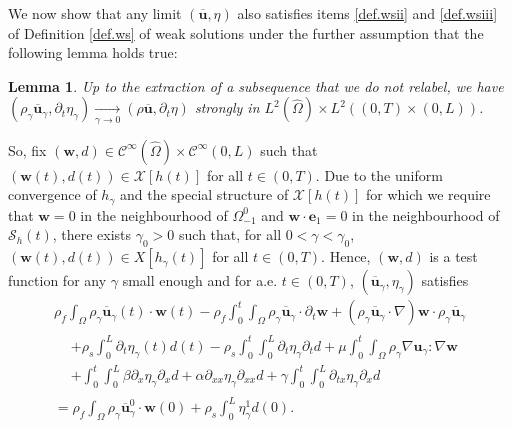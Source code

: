 \documentclass[JEP,XML,SOM,Unicode,NoFloatCountersInSection]{cedram}
\let\mathcal\mathscr
\newtheorem{lemma}[theorem]{Lemma}
\theoremstyle{remark}
\theoremstyle{definition}
\newcommand{\ug}{\boldsymbol{u}}
\newcommand{\wg}{\boldsymbol{w}}
\newcommand{\BS}[1]{\boldsymbol{#1}}
\let\CM\Omega
\newcommand{\CMT}{\widehat{\Omega}}
\begin{document}
We now show that any limit $(\overline{\ug},\eta)$ also satisfies items \eqref{def.wsii} and \eqref{def.wsiii} of Definition \ref{def.ws} of weak solutions under the further assumption that the following lemma holds true:

\begin{lemma}\label{lemma.convergence.L2} Up to the extraction of a subsequence that we do not relabel, we have $(\rho_\gamma\overline{\ug}_{\gamma},\partial_{t}\eta_{\gamma})\underset{\gamma\to 0}{\to}(\rho\overline{\ug},\partial_{t}\eta)$ strongly in $L^{2}(\CMT)\times L^{2}((0, T)\times (0,L))$.
\end{lemma}

So, fix $(\wg, d)\in\mathcal{C}^{\infty}(\CMT)\times \mathcal{C}^{\infty}(0, L) $ such that $(\wg(t), d(t))\in\mathcal{X}[h(t)]$ for all $t\in(0,T)$.
Due to the uniform convergence of $h_\gamma$ and the special structure of $\mathcal{X}[h(t)]$ for which we require that $\wg=0$ in the neighbourhood of $\Omega^0_{-1}$ and $\wg\cdot\BS{e}_{1}=0$ in the neighbourhood of $\mathcal{S}_h(t)$, there exists $\gamma_{0}>0$ such that, for all $0<\gamma<\gamma_{0}$, $(\wg(t),d(t))\in X[h_{\gamma}(t)]$ for all $t\in(0,T)$. Hence, $(\wg,d)$ is a test function for any $\gamma$ small enough and for a.e. $t\in(0,T)$, $(\overline{\ug}_{\gamma},\eta_{\gamma})$ satisfies
\begin{multline}\label{weak.formulation.FS.gamma.limit}
\rho_{f}\int_{\CM}\rho_{\gamma}\overline{\ug}_{\gamma}(t)\cdot\wg(t) -\rho_{f}\int_{0}^{t}\int_{\CM}\rho_{\gamma}\overline{\ug}_{\gamma}\cdot\partial_{t}\wg + (\rho_{\gamma}\overline{\ug}_{\gamma}\cdot\nabla)\wg\cdot\rho_{\gamma}\overline{\ug}_{\gamma}\\
\begin{aligned}
&+\rho_{s}\int_{0}^{L}\partial_{t}\eta_{\gamma}(t)d(t)-\rho_{s}\int_{0}^{t}\int_{0}^{L}\partial_{t}\eta_{\gamma}\partial_{t}d+\mu\int_{0}^{t}\int_{\CM}\rho_{\gamma} \nabla\ug_{\gamma}:\nabla\wg\\
&+\int_{0}^{t}\int_{0}^{L}\beta\partial_{x}\eta_{\gamma}\partial_{x}d + \alpha\partial_{xx}\eta_{\gamma}\partial_{xx}d+\gamma\int_{0}^{t}\int_{0}^{L}\partial_{tx}\eta_{\gamma}\partial_{x}d
\end{aligned}
\\
=\rho_{f}\int_{\CM}\rho_{\gamma}\overline{\ug}^{0}_{\gamma}\cdot\wg(0)+\rho_{s}\int_{0}^{L}\eta^{1}_{\gamma}d(0).
\end{multline}
\end{document}
